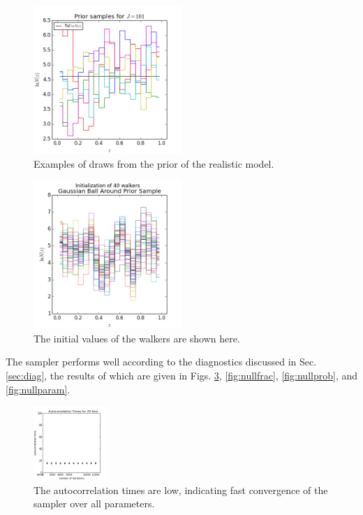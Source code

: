 \documentclass[preprint]{aastex}
\begin{document}
\begin{figure}
\includegraphics[width=0.5\textwidth]{null/priorsamps.png}
\caption{Examples of draws from the prior of the realistic model.}
\label{fig:nullprior}
\end{figure}

\begin{figure}
\includegraphics[width=0.5\textwidth]{null/initializations.png}
\caption{The initial values of the walkers are shown here.}
\label{fig:nullival}
\end{figure}

The sampler performs well according to the diagnostics discussed in Sec. \ref{sec:diag}, the results of which are given in Figs. \ref{fig:nullacor}, \ref{fig:nullfrac}, \ref{fig:nullprob}, and \ref{fig:nullparam}.  

\begin{figure}
\includegraphics[width=0.25\textwidth]{times-real.png}
\caption{The autocorrelation times are low, indicating fast convergence of the sampler over all parameters.}
\label{fig:nullacor}
\end{figure}
\end{document}
